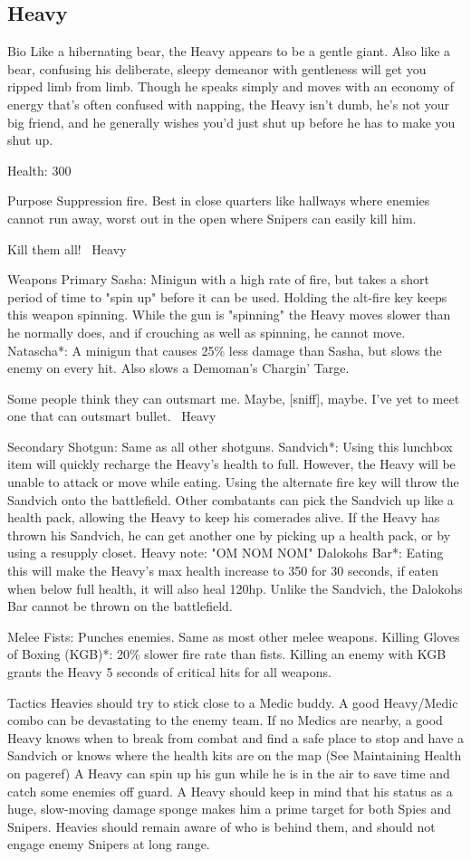 \subsection{Heavy}
Bio
Like a hibernating bear, the Heavy appears to be a gentle giant. Also like a bear, confusing his deliberate, sleepy demeanor with gentleness will get you ripped limb from limb. Though he speaks simply and moves with an economy of energy that's often confused with napping, the Heavy isn't dumb, he's not your big friend, and he generally wishes you'd just shut up before he has to make you shut up.

Health: 300

Purpose
Suppression fire. Best in close quarters like hallways where enemies cannot run away, worst out in the open where Snipers can easily kill him.

Kill them all! ~Heavy

Weapons
Primary
Sasha: Minigun with a high rate of fire, but takes a short period of time to "spin up" before it can be used. Holding the alt-fire key keeps this weapon spinning. While the gun is "spinning" the Heavy moves slower than he normally does, and if crouching as well as spinning, he cannot move.
Natascha*: A minigun that causes 25\% less damage than Sasha, but slows the enemy on every hit.  Also slows a Demoman's Chargin' Targe.

Some people think they can outsmart me. Maybe, [sniff], maybe. I've yet to meet one that can outsmart bullet. ~Heavy

Secondary
Shotgun: Same as all other shotguns.
Sandvich*: Using this lunchbox item will quickly recharge the Heavy's health to full.  However, the Heavy will be unable to attack or move while eating. Using the alternate fire key will throw the Sandvich onto the battlefield. Other combatants can pick the Sandvich up like a health pack, allowing the Heavy to keep his comerades alive. If the Heavy has thrown his Sandvich, he can get another one by picking up a health pack, or by using a resupply closet. {{Heavy note: "OM NOM NOM"}}
Dalokohs Bar*: Eating this will make the Heavy's max health increase to 350 for 30 seconds, if eaten when below full health, it will also heal 120hp. Unlike the Sandvich, the Dalokohs Bar cannot be thrown on the battlefield.

Melee
Fists: Punches enemies. Same as most other melee weapons.
Killing Gloves of Boxing (KGB)*:  20\% slower fire rate than fists.  Killing an enemy with KGB grants the Heavy 5 seconds of critical hits for all weapons.

Tactics
Heavies should try to stick close to a Medic buddy. A good Heavy/Medic combo can be devastating to the enemy team. 
If no Medics are nearby, a good Heavy knows when to break from combat and find a safe place to stop and have a Sandvich or knows where the health kits are on the map (See Maintaining Health on {{pageref}})
A Heavy can spin up his gun while he is in the air to save time and catch some enemies off guard.
A Heavy should keep in mind that his status as a huge, slow-moving damage sponge makes him a prime target for both Spies and Snipers. Heavies should remain aware of who is behind them, and should not engage enemy Snipers at long range.